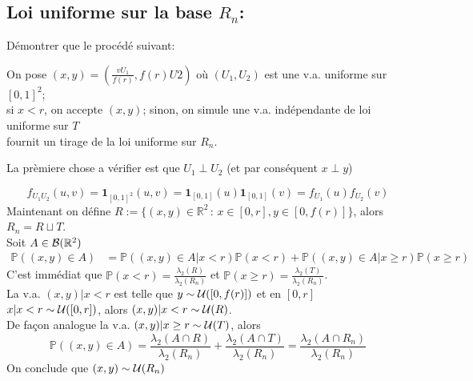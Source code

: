 \documentclass[a4paper]{article}
\begin{document}
\subsection{Loi uniforme sur la base $R_n$:} 

D\'emontrer que le proc\'ed\'e suivant:

On pose $(x,y) = \left(\frac{vU_1}{f(r)},f(r)U2\right)$ o\`u $(U_1,U_2)$ est une v.a. uniforme sur $[0,1]^2$;\\si $x<r$, on accepte $(x,y)$; sinon, on simule une v.a. ind\'ependante de loi uniforme sur $T$
\\fournit un tirage de la loi uniforme sur $R_n$.

La pr\`emiere chose a v\'erifier est que $U_1\perp U_2$ (et par conséquent $x\perp y$)

$$f_{U_1U_2}(u,v) = \mathbf{1}_{[0,1]^2}(u,v) = \mathbf{1}_{[0,1]}(u)\mathbf{1}_{[0,1]}(v) = f_{U_1}(u)f_{U_2}(v)$$
Maintenant on d\'efine $R := \{(x,y)\in\mathbb{R}^2\,:\,x\in[0,r],y\in[0,f(r)]\}$, alors $R_n = R\sqcup T$.
\\Soit $A\in{\cal B}(\mathbb{R}^2)$
\begin{align*}
\mathbb{P}((x,y)\in A) &= \mathbb{P}((x,y)\in A|x<r)\mathbb{P}(x<r) + \mathbb{P}((x,y)\in A|x\geq r)\mathbb{P}(x\geq r)
\end{align*}
C'est imm\'ediat que $\mathbb{P}(x<r) = \frac{\lambda_2(R)}{\lambda_2(R_n)}$ et $\mathbb{P}(x\geq r) = \frac{\lambda_2(T)}{\lambda_2(R_n)}$.\\La v.a. $(x,y)|x<r$ est telle que $y\sim{\cal U}([0,f(r)])$ et en $[0,r]$ $x|x<r\sim{\cal U}([0,r])$, alors $(x,y)|x<r\sim{\cal U}(R)$.
\\De fa\c{c}on analogue la v.a. $(x,y)|x\geq r\sim{\cal U}(T)$, alors
$$\mathbb{P}((x,y)\in A) = \frac{\lambda_2(A\cap R)}{\lambda_2(R_n)}+\frac{\lambda_2(A\cap T)}{\lambda_2(R_n)} = \frac{\lambda_2(A\cap R_n)}{\lambda_2(R_n)}$$
On conclude que $(x,y)\sim{\cal U}(R_n)$
\end{document}
